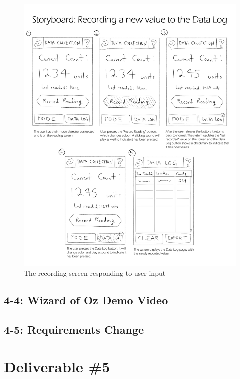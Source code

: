 \documentclass[11pt,a4paper]{article}
\begin{document}
\bigskip
\begin{figure}[h]
  \centering
  \hspace*{-0.5cm}
      \includegraphics[width=1.15\textwidth]{storyboard.png}
  \caption{The recording screen responding to user input}
\end{figure}

\newpage
\subsection*{4-4: Wizard of Oz Demo Video}
\subsection*{4-5: Requirements Change}

\newpage
\section*{Deliverable \#5}
\end{document}
